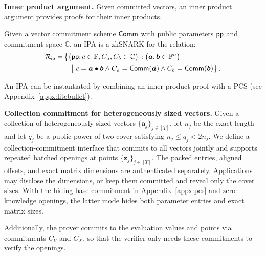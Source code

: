 \mysmallskip
\noindent
\textbf{Inner product argument.}
Given committed vectors, an inner product argument provides proofs for their inner products.

\begin{definition}
\label{def:ipa}
Given a vector commitment scheme ${\sf Comm}$
with public parameters ${\sf pp}$
and commitment space $\mathbb{C}$,
an IPA is a zkSNARK for the relation:
\begin{align*}
\mathcal{R}_{\sf ip} = & \left\{ \left( \begin{aligned} & {\sf pp}; c \in {\mathbb{F}}, C_a, C_b \in \mathbb{C} \\ \end{aligned} \right) \right. : \left( \begin{aligned} & \bm{a}, \bm{b} \in {\mathbb{F}}^n \\ \end{aligned} \right) \\
& \quad\left|~
\begin{aligned} c = \bm{a} \bullet \bm{b} \wedge C_a = {\sf Comm}(\vec{\bm{a}}) \wedge C_b = {\sf Comm}(\bm{b}) \end{aligned} \right\}.
\end{align*}
\end{definition}

An IPA can be instantiated by combining
an inner product proof with a PCS
(see Appendix~\ref{appx:litebullet}).

\mysmallskip
\noindent
\textbf{Collection commitment for heterogeneously sized vectors.}
Given a collection of heterogeneously sized vectors
$\{\bm{a}_j\}_{j\in [T]}$, let $n_j$ be the exact length and let $q_j$ be a
public power-of-two cover satisfying $n_j\le q_j<2n_j$.  We define a
collection-commitment interface that commits to all vectors jointly and
supports repeated batched openings at points $\{\bm{z}_j\}_{j\in[T]}$.  The
packed entries, aligned offsets, and exact matrix dimensions are authenticated
separately.  Applications may disclose the dimensions, or keep them committed
and reveal only the cover sizes.  With the hiding base commitment in
Appendix~\ref{appx:pcs} and zero-knowledge openings, the latter mode hides both
parameter entries and exact matrix sizes.

Additionally,
the prover commits to the evaluation values and points
via commitments $C_V$ and $C_X$,
so that the verifier only needs these commitments
to verify the openings.

